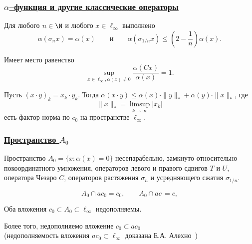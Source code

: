 \begin{frame}\frametitle{\underline{$\alpha$--функция и другие классические операторы}}
	\begin{ttheorem}
		Для любого $n\in\N$ и любого $x\in\ell_\infty$ выполнено
		\begin{equation}
			\alpha(\sigma_n x) = \alpha(x)
			\qquad\mbox{и}\qquad
			\alpha(\sigma_{1/n} x) \leq \left( 2- \frac{1}{n} \right) \alpha(x)
			.
		\end{equation}
	\end{ttheorem}

	\begin{ttheorem}
		Имеет место равенство
		\begin{equation}
			\sup_{x\in\ell_\infty, \alpha(x)\neq 0} \frac{\alpha(Cx)}{\alpha(x)}=1
			.
		\end{equation}
	\end{ttheorem}

	\begin{ttheorem}
		Пусть $(x\cdot y)_k = x_k\cdot y_k$.
		Тогда
		$\alpha(x\cdot y)\leq \alpha(x)\cdot \|y\|_* + \alpha(y)\cdot \|x\|_*$,
		где
		\begin{equation}
			\|x\|_* = \limsup_{k\to\infty} |x_k|
		\end{equation}
		есть  фактор-норма по $c_0$ на пространстве $\ell_\infty$.
	\end{ttheorem}
\end{frame}


\begin{frame}\frametitle{\underline{Пространство $A_0$}}

	Пространство $A_0 = \{x: \alpha(x) = 0\}$
	несепарабельно, замкнуто относительно покоординатного умножения,
	операторов левого и правого сдвигов $T$ и $U$,
	оператора Чезаро $C$,
	операторов растяжения $\sigma_n$ и усредняющего сжатия $\sigma_{1/n}$.

	\begin{equation}
		A_0 \cap ac_0 = c_0,
		\qquad
		A_0 \cap ac\, = c,
	\end{equation}

	\vfill

	Оба вложения
	\qquad$
		c_0 \subset A_0 \subset \ell_\infty
	$\qquad
	недополняемы.

	\vfill

	Более того, недополняемо вложение $c_0 \subset ac_0$
	\\
	(недополняемость вложения $ac_0 \subset \ell_\infty$ доказана Е.А. Алехно~\cite[{Theorem 8}]{alekhno2006propertiesII})
\end{frame}
